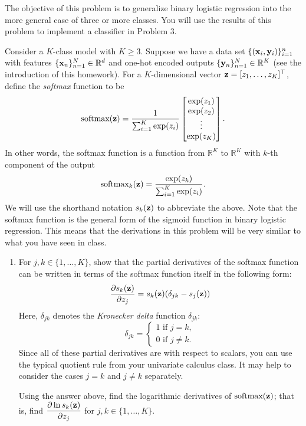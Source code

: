 \documentclass[submit]{harvardml}
\begin{document}
\begin{problem}
The objective of this problem is to generalize binary logistic regression into the more general case of three or more classes. You will use the results of this problem to implement a classifier in Problem 3.

Consider a $K$-class model with $K \geq 3$. Suppose we have a data set $\{(\mathbf{x}_i,
\mathbf{y}_i)\}_{i=1}^n$ with features $\{\mathbf{x}_n\}_{n = 1}^N \in \mathbb{R}^d$ and one-hot encoded outputs $\{\mathbf{y}_n\}_{n = 1}^N \in \mathbb{R}^K$ (see the introduction of this homework). For a $K$-dimensional vector $\mathbf{z} = [z_1, \dots, z_K]^\top$, define the \textit{softmax} function to be
$$
\text{softmax}(\mathbf{z}) = \frac{1}{\sum_{i = 1}^K \exp(z_i)}
\begin{bmatrix}
\exp(z_1) \\
\exp(z_2) \\
\vdots \\
\exp(z_K)
\end{bmatrix}.
$$
In other words, the softmax function is a function from $\mathbb{R}^K$ to $\mathbb{R}^K$ with $k$-th component of the output
$$
\text{softmax}_k(\mathbf{z}) = \frac{\exp(z_k)}{\sum_{i = 1}^K \exp(z_i)}.
$$
We will use the shorthand notation $s_k(\mathbf{z})$ to abbreviate the above. Note that the softmax function is the general form of the sigmoid function in binary logistic regression. This means that the derivations in this problem will be very similar to what you have seen in class.

\begin{enumerate}
  \item For $j, k \in \{1, \dots, K\}$, show that the partial derivatives of the softmax function can be written in terms of the softmax function itself in the following form:
  $$
  \frac{\partial s_k(\mathbf{z})}{\partial z_j} = s_k(\mathbf{z})(\delta_{jk} - s_j(\mathbf{z}))
  $$
  Here, $\delta_{jk}$ denotes the \textit{Kronecker delta} function $\delta_{jk}$:
  $$
  \delta_{jk} = 
  \begin{cases}
    1 \text{ if } j = k, \\
    0 \text{ if } j \neq k.
  \end{cases}
  $$
  Since all of these partial derivatives are with respect to scalars, you can use the typical quotient rule from your univariate calculus class. It may help to consider the cases $j = k$ and $j \neq k$ separately.
  
  Using the answer above, find the logarithmic derivatives of $\text{softmax}(\mathbf{z})$; that is, find $\displaystyle \frac{\partial \ln s_k(\mathbf{z})}{\partial z_j}$ for $j, k \in \{1, \dots, K\}$.
\end{enumerate}


\end{problem}
\end{document}
